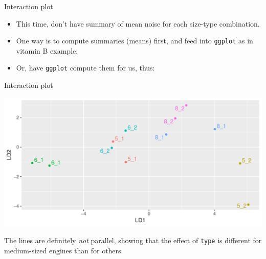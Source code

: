\begin{frame}[fragile]{Interaction plot}
  
  \begin{itemize}
  \item This time, don't have summary of mean noise for each size-type
    combination. 
  \item One way is to compute summaries (means) first, and feed into
    \texttt{ggplot} as in vitamin B example.
  \item Or, have \texttt{ggplot} compute them for us, thus:
    
\begin{knitrout}
\color{fgcolor}\begin{kframe}
\begin{alltt}
\hlkwb{=}\hlstd{(}
    \hlopt{+}
  \hlstd{(}\hlstd{=}\hlstd{)}\hlopt{+}
  \hlstd{(}\hlstd{=}\hlstd{)}
\end{alltt}
\end{kframe}
\end{knitrout}
  \end{itemize}
  
\end{frame}

\begin{frame}[fragile]{Interaction plot}
  
\begin{knitrout}
\color{fgcolor}\begin{kframe}
\begin{alltt}
\end{alltt}
\end{kframe}
\includegraphics[width=\maxwidth]{figure/unnamed-chunk-23-1} 

\end{knitrout}

The lines are definitely \emph{not} parallel, showing that the effect
of \texttt{type} is different for medium-sized engines than for others.
  
\end{frame}

